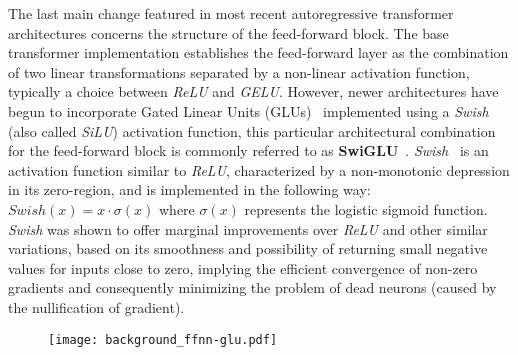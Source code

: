 The last main change featured in most recent autoregressive transformer architectures concerns the structure of the feed-forward block.
The base transformer implementation establishes the feed-forward layer as the combination of two linear transformations separated by a non-linear activation function, typically a choice between \emph{ReLU} and \emph{GELU}.
However, newer architectures have begun to incorporate Gated Linear Units (GLUs)~\cite{dauphin2017} implemented using a \emph{Swish} (also called \emph{SiLU}) activation function, this particular architectural combination for the feed-forward block is commonly referred to as \textbf{SwiGLU}~\cite{shazeer2020}.
\emph{Swish}~\cite{shazeer2020} is an activation function similar to \emph{ReLU}, characterized by a non-monotonic depression in its zero-region, and is implemented in the following way: $Swish(x) = x \cdot \sigma(x)$ where $\sigma(x)$ represents the logistic sigmoid function.
\emph{Swish} was shown to offer marginal improvements over \emph{ReLU} and other similar variations, based on its smoothness and possibility of returning small negative values for inputs close to zero, implying the efficient convergence of non-zero gradients and consequently minimizing the problem of dead neurons (caused by the nullification of gradient).

\begin{figure}[t!]
    \centering
    \texttt{[image: background\_ffnn-glu.pdf]}
    \caption{}
    \label{fig:background_ffnn-glu}
\end{figure}

